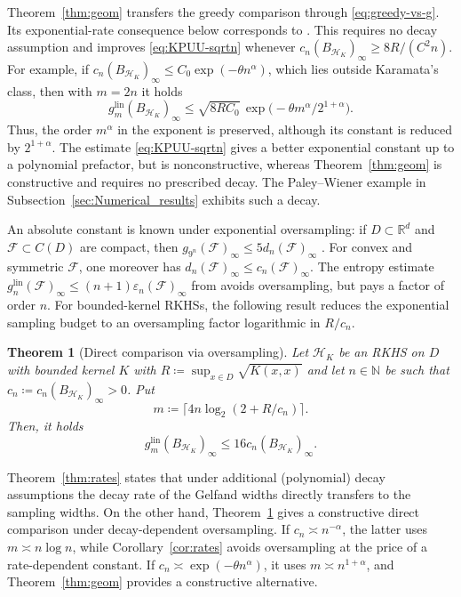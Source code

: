 \documentclass[11pt,reqno, a4paper]{article}
\numberwithin{equation}{section}
\newtheorem{theorem}{Theorem}[section]
\newcommand{\N}{\mathbb{N}}
\newcommand{\R}{\mathbb{R}}
\newcommand{\lin}{\ensuremath{\mathrm{lin}}}
\begin{document}
Theorem~\ref{thm:geom} transfers the greedy comparison
\cite[Cor.~3.3(i)]{DPW13} through \eqref{eq:greedy-vs-g}.
Its exponential-rate consequence below corresponds to \cite[Cor.~3.3(iii)]{DPW13}.
This requires no decay assumption and improves \eqref{eq:KPUU-sqrtn} whenever $c_n(B_{\mathcal H_K})_\infty\ge 8R/(C^2n)$.
For example, if $c_n(B_{\mathcal H_K})_\infty\le C_0\exp(-\theta n^\alpha)$, which lies outside Karamata's class, then with $m=2n$ it holds
\begin{equation}
g_m^{\lin}(B_{\mathcal H_K})_\infty
\le \sqrt{8RC_0}\,
\exp\bigl(-\theta m^\alpha/2^{1+\alpha}\bigr).
\end{equation}
Thus, the order $m^\alpha$ in the exponent is preserved, although its
constant is reduced by $2^{1+\alpha}$. 
The estimate \eqref{eq:KPUU-sqrtn} gives a better exponential constant up to a
polynomial prefactor, but is nonconstructive, whereas
Theorem~\ref{thm:geom} is constructive and requires no prescribed decay.
The Paley--Wiener example in Subsection~\ref{sec:Numerical_results}
exhibits such a decay.

An absolute constant is known under exponential oversampling:
if $D\subset\R^d$ and $\mathcal F\subset C(D)$ are compact, then $g_{9^n}(\mathcal F)_\infty\le5d_n(\mathcal F)_\infty$
\cite{KKT21}.
For convex and symmetric $\mathcal F$, one moreover has $d_n(\mathcal F)_\infty\le c_n(\mathcal F)_\infty$.
The entropy estimate $g_n^{\lin}(\mathcal F)_\infty\le(n+1)\varepsilon_n(\mathcal F)_\infty$
from \cite{U26} avoids oversampling, but pays a factor of order $n$.
For bounded-kernel RKHSs, the following result reduces the exponential sampling budget to an oversampling factor logarithmic in $R/c_n$.
 
\begin{theorem}[Direct comparison via oversampling]\label{thm:log}
Let $\mathcal H_K$ be an RKHS on $D$ with bounded kernel $K$ with $R\coloneqq\sup_{x\in D}\sqrt{K(x,x)}$ and let $n\in\N$ be such that $c_n\coloneqq c_n(B_{\mathcal H_K})_\infty>0$.
Put 
\begin{equation}
    m\coloneqq \lceil 4n\log_2(2+R/c_n) \rceil.
\end{equation} 
Then, it holds
\begin{equation}
g_{m}^{\lin}(B_{\mathcal H_K})_\infty  \le 16 c_n(B_{\mathcal H_K})_\infty.
\end{equation}
\end{theorem}

Theorem~\ref{thm:rates} states that under additional (polynomial) decay assumptions the decay rate of the Gelfand widths directly transfers to the sampling widths. On the other hand, Theorem~\ref{thm:log} gives a constructive direct comparison under decay-dependent oversampling.
If $c_n\asymp n^{-\alpha}$, the latter uses $m\asymp n\log n$, while Corollary~\ref{cor:rates} avoids oversampling at the price of a rate-dependent constant.
If $c_n\asymp\exp(-\theta n^\alpha)$, it uses $m\asymp n^{1+\alpha}$, and Theorem~\ref{thm:geom} provides a constructive alternative.
\end{document}
